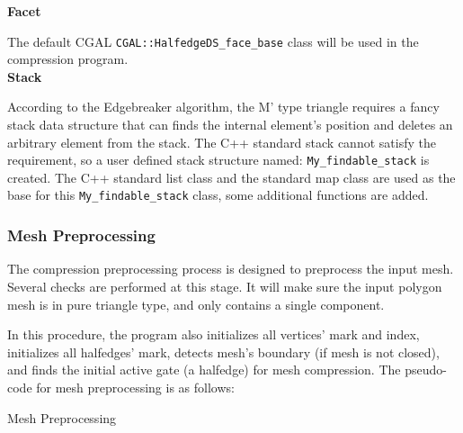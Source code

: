 \documentclass[onecolumn, 12pt]{article}
\begin{document}
{\setlength\parindent{0pt}
\textbf{Facet}\vspace{0.5em}}

The default CGAL \lstinline!CGAL::HalfedgeDS_face_base! class will be used in the compression program.\\

{\setlength\parindent{0pt}
\textbf{Stack}\vspace{0.5em}}

According to the Edgebreaker algorithm, the M' type triangle requires a fancy stack data structure that can finds the internal element's position and deletes an arbitrary element from the stack. The C++ standard stack cannot satisfy the requirement, so a user defined stack structure named: \lstinline!My_findable_stack! is created. The C++ standard list class and the standard map class are used as the base for this \lstinline!My_findable_stack! class, some additional functions are added.


\subsubsection{Mesh Preprocessing}
The compression preprocessing process is designed to preprocess the input mesh. Several checks are performed at this stage. It will make sure the input polygon mesh is in pure triangle type, and only contains a single component.

In this procedure, the program also initializes all vertices' mark and index, initializes all halfedges' mark, detects mesh's boundary (if mesh is not closed), and finds the initial active gate (a halfedge) for mesh compression. The pseudo-code for mesh preprocessing is as follows:

\begin{algorithm}[H]
\caption{Mesh Preprocessing}
\begin{algorithmic}[1]
\ENDIF
{}
\ENDIF
{}
\ELSE
\ENDIF
{}
\end{algorithmic}
\end{algorithm}
\end{document}

